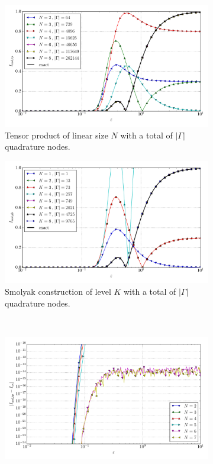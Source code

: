 \documentclass[a4paper,10pt]{article}
\begin{document}
\begin{figure}[ht!]
  \begin{subfigure}[t]{0.5\linewidth}
    \includegraphics[width=\linewidth]{./plots/tp_sg_6d_conv_eps_(5,0,0,0,0,0)_(5,0,0,0,0,0)_val_nsd_tp.pdf}
    \caption{Tensor product of linear size $N$ with a total of $|\Gamma|$ quadrature nodes.}
    \label{fig:tp_sg_6d_conv_p_500000_500000_val_nsd_tp}
  \end{subfigure}
  \begin{subfigure}[t]{0.5\linewidth}
    \includegraphics[width=\linewidth]{./plots/tp_sg_6d_conv_eps_(5,0,0,0,0,0)_(5,0,0,0,0,0)_val_nsd_gk.pdf}
    \caption{Smolyak construction of level $K$ with a total of $|\Gamma|$ quadrature nodes.}
    \label{fig:tp_sg_6d_conv_p_500000_500000_val_nsd_gk}
  \end{subfigure} \\
  \begin{subfigure}[t]{0.5\linewidth}
    \includegraphics[width=\linewidth]{./plots/tp_sg_6d_conv_eps_(5,0,0,0,0,0)_(5,0,0,0,0,0)_err_nsd_tp.pdf}

\end{subfigure}
\end{figure}
\end{document}
